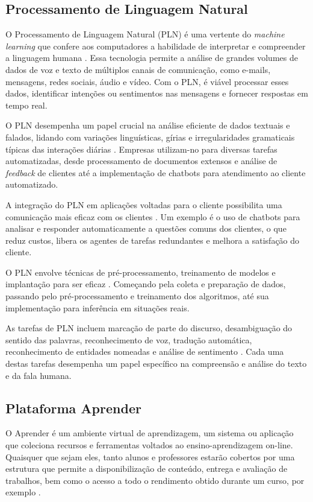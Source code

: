 \subsection{Processamento de Linguagem Natural}

O Processamento de Linguagem Natural (PLN) é uma vertente do \textit{machine learning} que confere aos computadores a habilidade de interpretar e compreender a linguagem humana \cite{amazonnlp2023}. Essa tecnologia permite a análise de grandes volumes de dados de voz e texto de múltiplos canais de comunicação, como e-mails, mensagens, redes sociais, áudio e vídeo. Com o PLN, é viável processar esses dados, identificar intenções ou sentimentos nas mensagens e fornecer respostas em tempo real.

O PLN desempenha um papel crucial na análise eficiente de dados textuais e falados, lidando com variações linguísticas, gírias e irregularidades gramaticais típicas das interações diárias \cite{amazonnlp2023}. Empresas utilizam-no para diversas tarefas automatizadas, desde processamento de documentos extensos e análise de \textit{feedback} de clientes até a implementação de chatbots para atendimento ao cliente automatizado.

A integração do PLN em aplicações voltadas para o cliente possibilita uma comunicação mais eficaz com os clientes \cite{amazonnlp2023}. Um exemplo é o uso de chatbots para analisar e responder automaticamente a questões comuns dos clientes, o que reduz custos, libera os agentes de tarefas redundantes e melhora a satisfação do cliente.

O PLN envolve técnicas de pré-processamento, treinamento de modelos e implantação para ser eficaz \cite{amazonnlp2023}. Começando pela coleta e preparação de dados, passando pelo pré-processamento e treinamento dos algoritmos, até sua implementação para inferência em situações reais.

As tarefas de PLN incluem marcação de parte do discurso, desambiguação do sentido das palavras, reconhecimento de voz, tradução automática, reconhecimento de entidades nomeadas e análise de sentimento \cite{amazonnlp2023}. Cada uma destas tarefas desempenha um papel específico na compreensão e análise do texto e da fala humana.

\subsection{Plataforma Aprender}

O Aprender é um ambiente virtual de aprendizagem, um sistema ou aplicação que coleciona recursos e ferramentas voltados ao ensino-aprendizagem on-line. Quaisquer que sejam eles, tanto alunos e professores estarão cobertos por uma estrutura que permite a disponibilização de conteúdo, entrega e avaliação de trabalhos, bem como o acesso a todo o rendimento obtido durante um curso, por exemplo \cite{boasvindasunb}.


